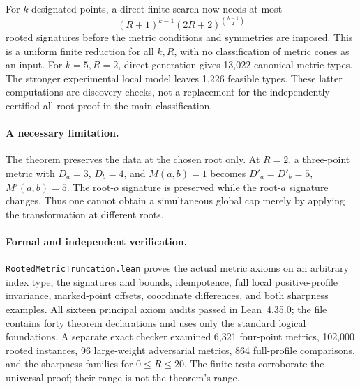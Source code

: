 For $k$ designated points, a direct finite search now needs at most
\[
 (R+1)^{k-1}(2R+2)^{\binom{k-1}{2}}
\]
rooted signatures before the metric conditions and symmetries are imposed.
This is a uniform finite reduction for all $k,R$, with no classification of
metric cones as an input. For $k=5,R=2$, direct generation gives 13,022
canonical metric types. The stronger experimental local model leaves 1,226
feasible types. These latter computations are discovery checks, not a
replacement for the independently certified all-root proof in the main
classification.

\paragraph{A necessary limitation.}
The theorem preserves the data at the chosen root only. At $R=2$, a
three-point metric with $D_a=3$, $D_b=4$, and $M(a,b)=1$ becomes
$D'_a=D'_b=5$, $M'(a,b)=5$. The root-$o$ signature is preserved while the
root-$a$ signature changes. Thus one cannot obtain a simultaneous global
cap merely by applying the transformation at different roots.

\paragraph{Formal and independent verification.}
\texttt{RootedMetricTruncation.lean} proves the actual metric axioms on an
arbitrary index type, the signatures and bounds, idempotence, full local
positive-profile invariance, marked-point offsets, coordinate differences,
and both sharpness examples. All sixteen principal axiom audits passed in
Lean~4.35.0; the file contains forty theorem declarations and uses only the
standard logical foundations. A separate exact checker examined 6,321
four-point metrics, 102,000 rooted instances, 96 large-weight adversarial
metrics, 864 full-profile comparisons, and the sharpness families for
$0\le R\le20$. The finite tests corroborate the universal proof; their
range is not the theorem's range.
